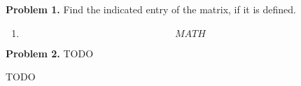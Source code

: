 \documentclass[12pt]{article}
\newenvironment{quo}{\begin{framed}\begin{minipage}{0.97\textwidth}
  \setlength{\parskip}{4mm}
}{\end{minipage}\end{framed}}
\begin{document}
\begin{quo}
  {\bf Problem 1.}
  Find the indicated entry of the matrix, if it is defined.
  $$ $$
\end{quo}

\begin{enumerate}
	\item $$ MATH $$
\end{enumerate}

\begin{quo}
  {\bf Problem 2.}
  TODO
\end{quo}
TODO
\end{document}
